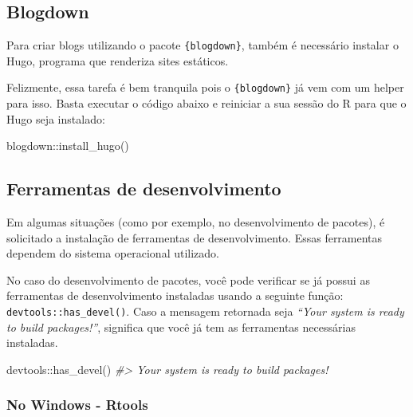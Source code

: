 \documentclass[
]{book}
\newenvironment{Shaded}{\begin{snugshade}}{\end{snugshade}}
\newcommand{\CommentTok}[1]{\textcolor[rgb]{0.56,0.35,0.01}{\textit{#1}}}
\newcommand{\FunctionTok}[1]{\textcolor[rgb]{0.00,0.00,0.00}{#1}}
\newcommand{\NormalTok}[1]{#1}
\newcommand{\SpecialCharTok}[1]{\textcolor[rgb]{0.00,0.00,0.00}{#1}}
\begin{document}
\hypertarget{blogdown}{%
\subsection{Blogdown}\label{blogdown}}

Para criar blogs utilizando o pacote \texttt{\{blogdown\}}, também é necessário instalar o Hugo, programa que renderiza sites estáticos.

Felizmente, essa tarefa é bem tranquila pois o \texttt{\{blogdown\}} já vem com um helper para isso. Basta executar o código abaixo e reiniciar a sua sessão do R para que o Hugo seja instalado:

\begin{Shaded}
\begin{Highlighting}[]
\NormalTok{blogdown}\SpecialCharTok{::}\FunctionTok{install\_hugo}\NormalTok{()}
\end{Highlighting}
\end{Shaded}

\hypertarget{ferramentas-de-desenvolvimento}{%
\subsection{Ferramentas de desenvolvimento}\label{ferramentas-de-desenvolvimento}}

Em algumas situações (como por exemplo, no desenvolvimento de pacotes), é solicitado a instalação de ferramentas de desenvolvimento. Essas ferramentas dependem do sistema operacional utilizado.

No caso do desenvolvimento de pacotes, você pode verificar se já possui as ferramentas de desenvolvimento instaladas usando a seguinte função: \texttt{devtools::has\_devel()}. Caso a mensagem retornada seja \emph{``Your system is ready to build packages!''}, significa que você já tem as ferramentas necessárias instaladas.

\begin{Shaded}
\begin{Highlighting}[]
\NormalTok{devtools}\SpecialCharTok{::}\FunctionTok{has\_devel}\NormalTok{()}
\CommentTok{\#\textgreater{} Your system is ready to build packages!}
\end{Highlighting}
\end{Shaded}

\hypertarget{no-windows---rtools}{%
\subsubsection{No Windows - Rtools}\label{no-windows---rtools}}
\end{document}
